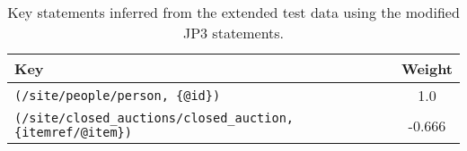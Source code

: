 \begin{table}
\label{TAB_inferred_keys_3}
\caption{Key statements inferred from the extended test data using the modified JP3 statements.}
\begin{tabular}{|l|c|}
\hline
\textbf{Key} & \textbf{Weight} \\ \hline \hline
\texttt{(/site/people/person, \{@id\})} & 1.0 \\ \hline
\texttt{(/site/closed\_auctions/closed\_auction, \{itemref/@item\})} & -0.666 \\ \hline
\end{tabular}
\end{table}
